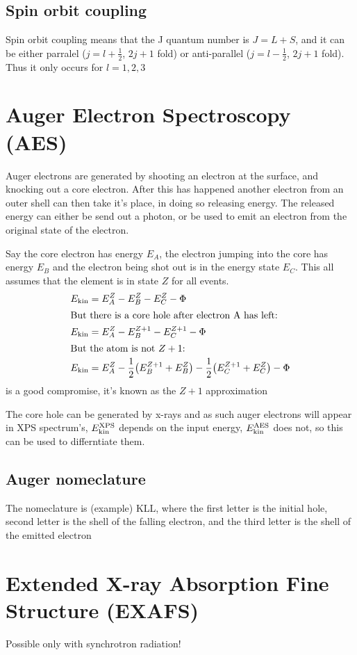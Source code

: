 \documentclass[article,oneside]{memoir}
\begin{document}
\section{Spin orbit coupling}
Spin orbit coupling means that the J quantum number is $J=L+S$, and it can be either parralel ($j=l+\frac{1}{2}$, $2j+1$ fold) or anti-parallel ($j=l-\frac{1}{2}$, $2j+1$ fold). Thus it only occurs for $l=1,2,3$
\chapter{Auger Electron Spectroscopy (AES)}
Auger electrons are generated by shooting an electron at the surface, and knocking out a core electron. After this has happened another electron from an outer shell can then take it's place, in doing so releasing energy. The released energy can either be send out a photon, or be used to emit an electron from the original state of the electron.

Say the core electron has energy $E_A$, the electron jumping into the core has energy $E_{B}$ and the electron being shot out is in the energy state $E_{C}$.
This all assumes that the element is in state $Z$ for all events. 
\begin{align*}
        E_{\textup{kin}}&=E_{A}^{Z}-E_{B}^{Z}-E_{C}^{Z}-\Phi\\
        \intertext{But there is a core hole after electron A has left:}
        E_{\textup{kin}}&=E_{A}^{Z}-E_{B}^{Z+1}-E_{C}^{Z+1}-\Phi\\
        \intertext{But the atom is not $Z+1$:}
        E_{\textup{kin}}&=E_{A}^{Z}-\frac{1}{2}\big(E_{B}^{Z+1}+E_{B}^{Z}\big)-\frac{1}{2}\big(E_{C}^{Z+1}+E_{C}^{Z}\big)-\Phi
\end{align*}
is a good compromise, it's known as the $Z+1$ approximation

The core hole can be generated by x-rays and as such auger electrons will appear in XPS spectrum's, $E_{\textup{kin}}^{\textup{XPS}}$ depends on the input energy, $E_{\textup{kin}}^{\textup{AES}}$ does not, so this can be used to differntiate them.
\section{Auger nomeclature}
The nomeclature is (example) KLL, where the first letter is the initial hole, second letter is the shell of the falling electron, and the third letter is the shell of the emitted electron
\chapter{Extended X-ray Absorption Fine Structure (EXAFS)}
Possible only with synchrotron radiation!
\end{document}
